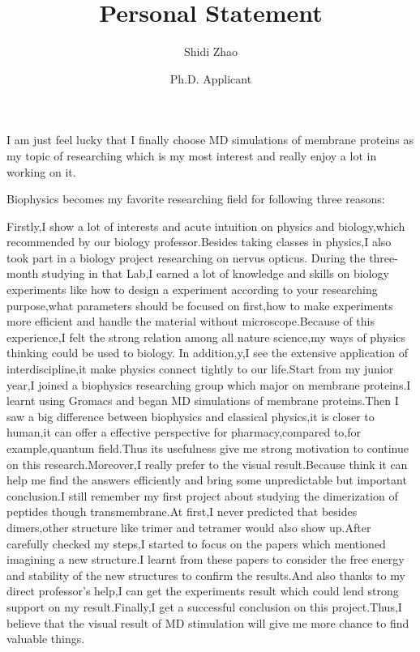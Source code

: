 \documentclass[12pt,a4paper]{article}
\title{\calligra Personal Statement\textsuperscript{\sf\textcopyright}}
\author{Shidi Zhao}
\date{Ph.D. Applicant}
\begin{document}
\maketitle
\thispagestyle{empty}
\noindent I am just feel lucky that I finally choose MD simulations of membrane proteins as my topic of researching which is my most interest and really enjoy a lot in working on it.\par
Biophysics becomes my favorite researching field for following three reasons:\par
Firstly,I show a lot of interests and acute intuition on physics and biology,which recommended by our biology professor.Besides taking classes in physics,I also took part in a biology project researching on nervus opticus. During the three-month studying in that Lab,I earned a lot of knowledge and skills on biology experiments like how to design a experiment according to your researching purpose,what parameters should be focused on first,how to make experiments more efficient and handle the material without microscope.Because of this experience,I felt the strong relation among all nature science,my ways of physics thinking could be used to biology. In addition,y,I see the extensive application of interdiscipline,it make physics connect tightly to our life.Start from my junior year,I joined a biophysics researching group which major on membrane proteins.I learnt using Gromacs and began MD simulations of membrane proteins.Then I saw a big difference between biophysics and classical physics,it is closer to human,it can offer a effective perspective for pharmacy,compared to,for example,quantum field.Thus its usefulness give me strong motivation to continue on this research.Moreover,I really prefer to the visual result.Because think it can help me find the answers efficiently and bring some unpredictable but important conclusion.I still remember my first project about studying the dimerization of peptides though transmembrane.At first,I never predicted that besides dimers,other structure like trimer and tetramer would also show up.After carefully checked my steps,I started to focus on the papers which mentioned imagining a new structure.I learnt from these papers to consider the free energy and stability of the new structures to confirm the results.And also thanks to my direct professor’s help,I can get the experiments result which could lend strong support on my result.Finally,I get a successful conclusion on this project.Thus,I believe that the visual result of MD stimulation will give me more chance to find valuable things.\par
\end{document}
